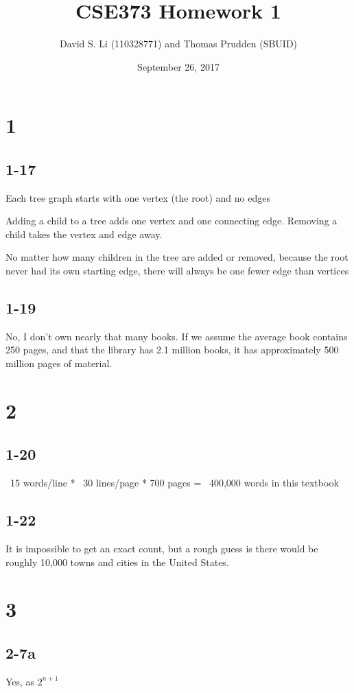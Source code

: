 \documentclass[16pt]{article}
\title{CSE373 Homework 1}
\author{David S. Li (110328771) and Thomas Prudden (SBUID)}
\date{September 26, 2017}
\begin{document}
\maketitle
\section*{1}
\subsection*{1-17}
\noindent Each tree graph starts with one vertex (the root) and no edges \par
\noindent Adding a child to a tree adds one vertex and one connecting edge.  Removing a child takes the vertex and edge away. \par
\noindent No matter how many children in the tree are added or removed, because the root never had its own starting edge, there will always be one fewer edge than vertices
\subsection*{1-19}
\noindent No, I don't own nearly that many books.  If we assume the average book contains 250 pages, and that the library has 2.1 million books, it has approximately 500 million pages of material.
\section*{2}
\subsection*{1-20}
\noindent
~15 words/line * ~30 lines/page * 700 pages = ~400,000 words in this textbook
\subsection*{1-22}
\noindent
It is impossible to get an exact count, but a rough guess is there would be roughly 10,000 towns and cities in the United States.

\section*{3}
\subsection*{2-7a}

\noindent Yes, as $2^{n + 1}$
\end{document}
